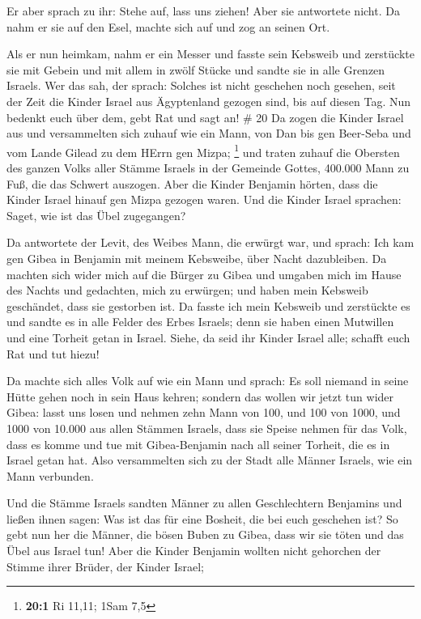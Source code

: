  Er aber sprach zu ihr: Stehe auf, lass uns ziehen! Aber
sie antwortete nicht. Da nahm er sie auf den Esel, machte sich auf und
zog an seinen Ort.

 Als er nun heimkam, nahm er ein Messer und fasste sein
Kebsweib und zerstückte sie mit Gebein und mit allem in zwölf Stücke und
sandte sie in alle Grenzen Israels.  Wer das sah, der
sprach: Solches ist nicht geschehen noch gesehen, seit der Zeit die
Kinder Israel aus Ägyptenland gezogen sind, bis auf diesen Tag. Nun
bedenkt euch über dem, gebt Rat und sagt an! \# 20  Da zogen
die Kinder Israel aus und versammelten sich zuhauf wie ein Mann, von Dan
bis gen Beer-Seba und vom Lande Gilead zu dem HErrn gen Mizpa;
\footnote{\textbf{20:1} Ri 11,11; 1Sam 7,5}  und traten
zuhauf die Obersten des ganzen Volks aller Stämme Israels in der
Gemeinde Gottes, 400.000 Mann zu Fuß, die das Schwert auszogen.
 Aber die Kinder Benjamin hörten, dass die Kinder Israel
hinauf gen Mizpa gezogen waren. Und die Kinder Israel sprachen: Saget,
wie ist das Übel zugegangen?

 Da antwortete der Levit, des Weibes Mann, die erwürgt war,
und sprach: Ich kam gen Gibea in Benjamin mit meinem Kebsweibe, über
Nacht dazubleiben.  Da machten sich wider mich auf die
Bürger zu Gibea und umgaben mich im Hause des Nachts und gedachten, mich
zu erwürgen; und haben mein Kebsweib geschändet, dass sie gestorben ist.
 Da fasste ich mein Kebsweib und zerstückte es und sandte es
in alle Felder des Erbes Israels; denn sie haben einen Mutwillen und
eine Torheit getan in Israel.  Siehe, da seid ihr Kinder
Israel alle; schafft euch Rat und tut hiezu!

 Da machte sich alles Volk auf wie ein Mann und sprach: Es
soll niemand in seine Hütte gehen noch in sein Haus kehren; 
sondern das wollen wir jetzt tun wider Gibea:  lasst uns
losen und nehmen zehn Mann von 100, und 100 von 1000, und 1000 von
10.000 aus allen Stämmen Israels, dass sie Speise nehmen für das Volk,
dass es komme und tue mit Gibea-Benjamin nach all seiner Torheit, die es
in Israel getan hat.  Also versammelten sich zu der Stadt
alle Männer Israels, wie ein Mann verbunden.

 Und die Stämme Israels sandten Männer zu allen
Geschlechtern Benjamins und ließen ihnen sagen: Was ist das für eine
Bosheit, die bei euch geschehen ist?  So gebt nun her die
Männer, die bösen Buben zu Gibea, dass wir sie töten und das Übel aus
Israel tun! Aber die Kinder Benjamin wollten nicht gehorchen der Stimme
ihrer Brüder, der Kinder Israel;


